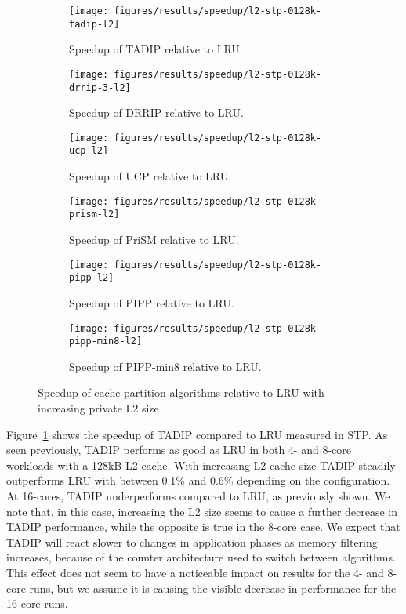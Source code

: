 \begin{figure}[!th]
    \centering
    \begin{subfigure}[b]{0.5\textwidth}
        \texttt{[image: figures/results/speedup/l2-stp-0128k-tadip-l2]}
        \caption{Speedup of TADIP relative to LRU.}
        \label{fig:results:l2:tadip}
    \end{subfigure}%
    \begin{subfigure}[b]{0.5\textwidth}
        \texttt{[image: figures/results/speedup/l2-stp-0128k-drrip-3-l2]}
        \caption{Speedup of DRRIP relative to LRU.}
        \label{fig:results:l2:drrip}
    \end{subfigure}
    \begin{subfigure}[b]{0.5\textwidth}
        \texttt{[image: figures/results/speedup/l2-stp-0128k-ucp-l2]}
        \caption{Speedup of UCP relative to LRU.}
        \label{fig:results:l2:ucp}
    \end{subfigure}%
    \begin{subfigure}[b]{0.5\textwidth}
        \texttt{[image: figures/results/speedup/l2-stp-0128k-prism-l2]}
        \caption{Speedup of PriSM relative to LRU.}
        \label{fig:results:l2:prism}
    \end{subfigure}
    \begin{subfigure}[b]{0.5\textwidth}
        \texttt{[image: figures/results/speedup/l2-stp-0128k-pipp-l2]}
        \caption{Speedup of PIPP relative to LRU.}
        \label{fig:results:l2:pipp}
    \end{subfigure}%
    \begin{subfigure}[b]{0.5\textwidth}
        \texttt{[image: figures/results/speedup/l2-stp-0128k-pipp-min8-l2]}
        \caption{Speedup of PIPP-min8 relative to LRU.}
        \label{fig:results:l2:pipp-min8}
    \end{subfigure}
    \caption[Speedup with varying L2 size]{Speedup of cache partition algorithms relative to LRU with increasing private L2 size}
    \label{fig:results:l2}
\end{figure}

Figure~\ref{fig:results:l2:tadip} shows the speedup of TADIP compared to LRU measured in STP. 
As seen previously, TADIP performs as good as LRU in both 4- and 8-core workloads with a 128kB L2 cache.
With increasing L2 cache size TADIP steadily outperforms LRU with between 0.1\% and 0.6\% depending on the configuration. 
At 16-cores, TADIP underperforms compared to LRU, as previously shown.
We note that, in this case, increasing the L2 size seems to cause a further decrease in TADIP performance, while the opposite is true in the 8-core case.
We expect that TADIP will react slower to changes in application phases as memory filtering increases, because of the counter architecture used to switch between algorithms.
This effect does not seem to have a noticeable impact on results for the 4- and 8-core runs, but we assume it is causing the visible decrease in performance for the 16-core runs.

